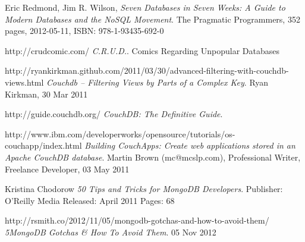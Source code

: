 \renewcommand\bibname{References}

\begin{thebibliography}{9}

  Eric Redmond, Jim R. Wilson,
  \emph{Seven Databases in Seven Weeks: A Guide to Modern Databases and the NoSQL Movement}.
  The Pragmatic Programmers,
  352 pages, 2012-05-11, 
  ISBN: 978-1-93435-692-0
  
  http://crudcomic.com/
  \emph{C.R.U.D.}.
  Comics Regarding Unpopular Databases
  
  http://ryankirkman.github.com/2011/03/30/advanced-filtering-with-couchdb-views.html
  \emph{Couchdb – Filtering Views by Parts of a Complex Key}.
  Ryan Kirkman, 30 Mar 2011

  http://guide.couchdb.org/
  \emph{CouchDB: The Definitive Guide}.  
  
  http://www.ibm.com/developerworks/opensource/tutorials/os-couchapp/index.html
  \emph{Building CouchApps: Create web applications stored in an Apache CouchDB database}.
  Martin Brown (mc@mcslp.com), Professional Writer, Freelance Developer, 
  03 May 2011
  
  Kristina Chodorow
  \emph{50 Tips and Tricks for MongoDB Developers}.
  Publisher: O'Reilly Media
  Released: April 2011
  Pages: 68
  
  http://rsmith.co/2012/11/05/mongodb-gotchas-and-how-to-avoid-them/
  \emph{5MongoDB Gotchas \& How To Avoid Them}.
  05 Nov 2012

\end{thebibliography}
